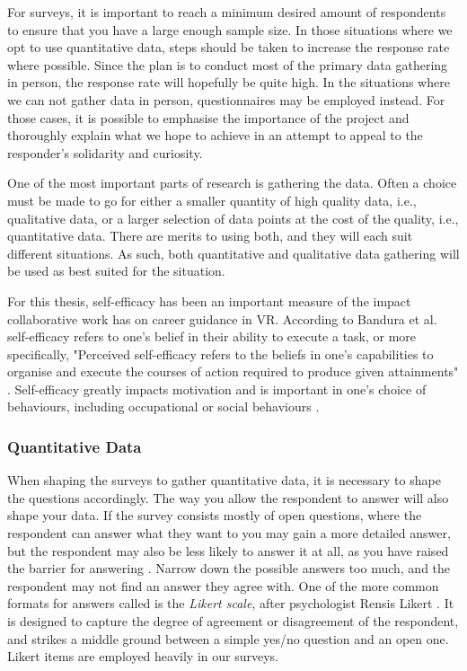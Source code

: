 For surveys, it is important to reach a minimum desired amount of respondents to ensure that you have a large enough sample size. In those situations where we opt to use quantitative data, steps should be taken to increase the response rate where possible. Since the plan is to conduct most of the primary data gathering in person, the response rate will hopefully be quite high. In the situations where we can not gather data in person, questionnaires may be employed instead. For those cases, it is possible to emphasise the importance of the project and thoroughly explain what we hope to achieve in an attempt to appeal to the responder's solidarity and curiosity. 

One of the most important parts of research is gathering the data. Often a choice must be made to go for either a smaller quantity of high quality data, i.e., qualitative data, or a larger selection of data points at the cost of the quality, i.e., quantitative data. There are merits to using both, and they will each suit different situations. As such, both quantitative and  qualitative data gathering will be used as best suited for the situation.

For this thesis, self-efficacy has been an important measure of the impact collaborative work has on career guidance in VR. According to Bandura et al. self-efficacy refers to one's belief in their ability to execute a task, or more specifically, "Perceived self-efficacy refers to the beliefs in one's capabilities to organise and execute the courses of action required to produce given attainments" \cite{bandura1999self}. Self-efficacy greatly impacts motivation and is important in one's choice of behaviours, including occupational or social behaviours \cite{bandura1999self}. 

\subsubsection{Quantitative Data}
When shaping the surveys to gather quantitative data, it is necessary to shape the questions accordingly. The way you allow the respondent to answer will also shape your data. If the survey consists mostly of open questions, where the respondent can answer what they want to you may gain a more detailed answer, but the respondent may also be less likely to answer it at all, as you have raised the barrier for answering \cite{oates2005researching}. Narrow down the possible answers too much, and the respondent may not find an answer they agree with. One of the more common formats for answers called is the \textit{Likert scale}, after psychologist Rensis Likert \cite{likert1932technique}. It is designed to capture the degree of agreement or disagreement of the respondent, and strikes a middle ground between a simple yes/no question and an open one. Likert items are employed heavily in our surveys.


